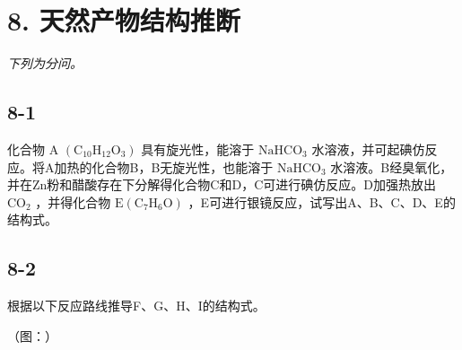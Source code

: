 \section*{8. 天然产物结构推断}
\textit{下列为分问。}

\subsection*{8-1}
化合物 A $\left( \mathrm { C _ { 1 0 } H _ { 1 2 } O _ { 3 } } \right)$ 具有旋光性，能溶于 $\mathrm { N a H C O _ { 3 } }$ ⽔溶液，并可起碘仿反应。将A加热的化合物B，B⽆旋光性，也能溶于 $\mathrm { N a H C O _ { 3 } }$ ⽔溶液。B经臭氧化，并在Zn粉和醋酸存在下分解得化合物C和D，C可进⾏碘仿反应。D加强热放出 $\mathrm { C O _ { 2 } }$ ，并得化合物 $\mathrm { E \left( C _ { 7 } H _ { 6 } O \right) }$ ，E可进⾏银镜反应，试写出A、B、C、D、E的结构式。

\subsection*{8-2}
根据以下反应路线推导F、G、H、I的结构式。

（图：）
